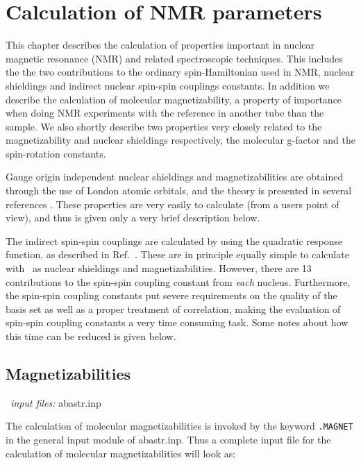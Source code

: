 \chapter{Calculation of NMR parameters}\label{ch:nmrchap}

This chapter describes the calculation of properties important in
nuclear magnetic resonance (NMR) and related spectroscopic techniques.
This includes the the two 
contributions to the ordinary spin-Hamiltonian used in NMR, nuclear
shieldings and indirect nuclear spin-spin couplings constants. In
addition we describe the calculation of molecular magnetizability, a
property of importance when doing NMR experiments with the reference
in another tube than the sample. We also shortly
describe two properties very closely related to the magnetizability
and nuclear shieldings respectively, the molecular g-factor and the
spin-rotation constants.

Gauge origin independent nuclear shieldings and magnetizabilities are
obtained through the use of London atomic orbitals, and the theory is
presented in several references
\cite{kwjfhppjacs112,krthrkpjklbhjajjcp100,krthklbpjhjajjcp99,krthklbpjjo}.
These properties are very easily to calculate (from a users point of
view), and thus is given only a very brief description below.

The indirect spin-spin couplings are calculated by using the quadratic
response function, as described in Ref.~\cite{ovhapjhjajsbpthjcp96}.
These are in principle equally simple to calculate with \aba\ as
nuclear shieldings and magnetizabilities. However, there are 13
contributions to the spin-spin coupling constant from {\em each}
nucleus. Furthermore, the spin-spin coupling constants put severe
requirements on the quality of the basis set as well as a proper
treatment of correlation, making the evaluation of spin-spin coupling
constants a very time consuming task. Some notes about how this time
can be reduced is given below.

\section{Magnetizabilities}\label{sec:magnetizability}

{\it \aba\ input files:} abastr.inp

\bigskip

The calculation of molecular magnetizabilities is invoked by the
keyword \verb|.MAGNET| in the general input module of abastr.inp. Thus
a complete input file for the calculation of molecular
magnetizabilities will look as:

